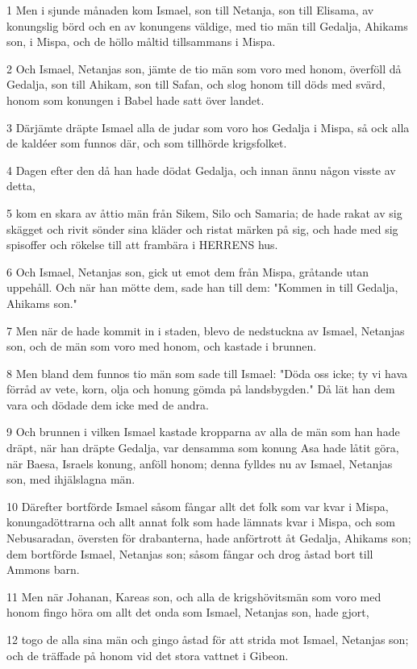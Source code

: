\par 1 Men i sjunde månaden kom Ismael, son till Netanja, son till Elisama, av konungslig börd och en av konungens väldige, med tio män till Gedalja, Ahikams son, i Mispa, och de höllo måltid tillsammans i Mispa.
\par 2 Och Ismael, Netanjas son, jämte de tio män som voro med honom, överföll då Gedalja, son till Ahikam, son till Safan, och slog honom till döds med svärd, honom som konungen i Babel hade satt över landet.
\par 3 Därjämte dräpte Ismael alla de judar som voro hos Gedalja i Mispa, så ock alla de kaldéer som funnos där, och som tillhörde krigsfolket.
\par 4 Dagen efter den då han hade dödat Gedalja, och innan ännu någon visste av detta,
\par 5 kom en skara av åttio män från Sikem, Silo och Samaria; de hade rakat av sig skägget och rivit sönder sina kläder och ristat märken på sig, och hade med sig spisoffer och rökelse till att frambära i HERRENS hus.
\par 6 Och Ismael, Netanjas son, gick ut emot dem från Mispa, gråtande utan uppehåll. Och när han mötte dem, sade han till dem: "Kommen in till Gedalja, Ahikams son."
\par 7 Men när de hade kommit in i staden, blevo de nedstuckna av Ismael, Netanjas son, och de män som voro med honom, och kastade i brunnen.
\par 8 Men bland dem funnos tio män som sade till Ismael: "Döda oss icke; ty vi hava förråd av vete, korn, olja och honung gömda på landsbygden." Då lät han dem vara och dödade dem icke med de andra.
\par 9 Och brunnen i vilken Ismael kastade kropparna av alla de män som han hade dräpt, när han dräpte Gedalja, var densamma som konung Asa hade låtit göra, när Baesa, Israels konung, anföll honom; denna fylldes nu av Ismael, Netanjas son, med ihjälslagna män.
\par 10 Därefter bortförde Ismael såsom fångar allt det folk som var kvar i Mispa, konungadöttrarna och allt annat folk som hade lämnats kvar i Mispa, och som Nebusaradan, översten för drabanterna, hade anförtrott åt Gedalja, Ahikams son; dem bortförde Ismael, Netanjas son; såsom fångar och drog åstad bort till Ammons barn.
\par 11 Men när Johanan, Kareas son, och alla de krigshövitsmän som voro med honom fingo höra om allt det onda som Ismael, Netanjas son, hade gjort,
\par 12 togo de alla sina män och gingo åstad för att strida mot Ismael, Netanjas son; och de träffade på honom vid det stora vattnet i Gibeon.
